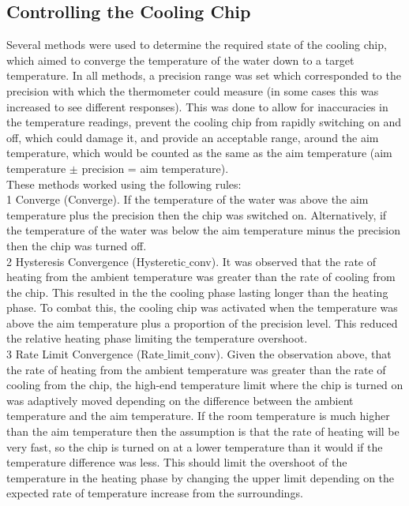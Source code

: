 \documentclass[10pt]{article}
\begin{document}

\subsection*{Controlling the Cooling Chip}
Several methods were used to determine the required state of the cooling chip, which aimed to converge the temperature of the water down to a target temperature. In all methods, a precision range was set which corresponded to the precision with which the thermometer could measure (in some cases this was increased to see different responses). This was done to allow for inaccuracies in the temperature readings, prevent the cooling chip from rapidly switching on and off, which could damage it, and provide an acceptable range, around the aim temperature, which would be counted as the same as the aim temperature (aim temperature $\pm$ precision = aim temperature).\\

These methods worked using the following rules:\\ %

1 Converge (Converge). If the temperature of the water was above the aim temperature plus the precision then the chip was switched on. Alternatively, if the temperature of the water was below the aim temperature minus the precision then the chip was turned off.\\

2 Hysteresis Convergence (Hysteretic$\_$conv). It was observed that the rate of heating from the ambient temperature was greater than the rate of cooling from the chip. This resulted in the the cooling phase lasting longer than the heating phase. To combat this, the cooling chip was activated when the temperature was above the aim temperature plus a proportion of the precision level. This reduced the relative heating phase limiting the temperature overshoot.\\

3 Rate Limit Convergence (Rate$\_$limit$\_$conv). Given the observation above, that the rate of heating from the ambient temperature was greater than the rate of cooling from the chip, the high-end temperature limit where the chip is turned on was adaptively moved depending on the difference between the ambient temperature and the aim temperature. If the room temperature is much higher than the aim temperature then the assumption is that the rate of heating will be very fast, so the chip is turned on at a lower temperature than it would if the temperature difference was less. This should limit the overshoot of the temperature in the heating phase by changing the upper limit depending on the expected rate of temperature increase from the surroundings. \\
\end{document}
